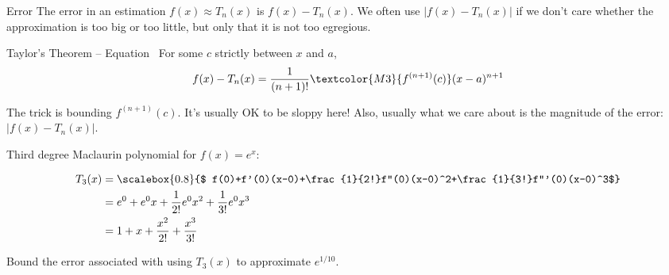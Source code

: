 \begin{frame}
\begin{block}{Error}
The error in an estimation $f(x) \approx  T_n(x)$ is \textcolor{M4}{$f(x)-T_n(x)$}. We often use \textcolor{M4}{$|f(x)-T_n(x)|$} if we don't care whether the approximation is too big or too little, but only that it is not too egregious.
\end{block}\vfill
\begin{block}{Taylor's Theorem -- Equation~}
For some \textcolor{M3}{$c$} strictly between $x$ and $a$,
\[f(x)-T_n(x) = \frac{1}{(n+1)!}\textcolor{M3}{f^{(n+1)}(c)}(x-a)^{n+1}\]
\end{block}\vfill\pause

The trick is bounding $f^{(n+1)}(c)$. It's usually OK to be sloppy here! Also, usually what we care about is the magnitude of the error: $|f(x)-T_n(x)|$.
\end{frame}
\begin{frame}[t]\MoreSpace
Third degree Maclaurin polynomial for $f(x)=e^x$:\pause

\begin{align*}
T_3(x) &=\scalebox{0.8}{$ f(0)+f'(0)(x-0)+\frac{1}{2!}f''(0)(x-0)^2+\frac{1}{3!}f'''(0)(x-0)^3$}\\
&=e^0+e^0x+\frac{1}{2!}e^0x^2+\frac{1}{3!}e^0x^3\\
&=1+x+\frac{x^2}{2!}+\frac{x^3}{3!}
\end{align*}\pause

Bound the error associated with using $T_3(x)$ to approximate $e^{1/10}$.
\end{frame}
